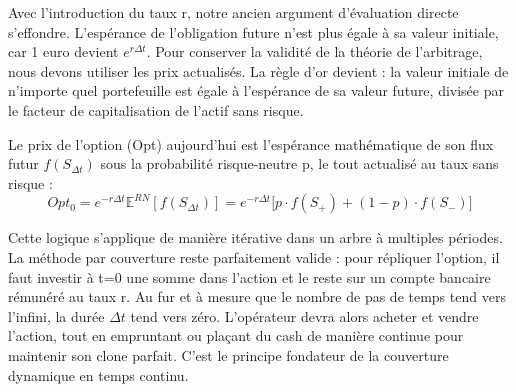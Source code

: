 \begin{remarquebox}
Avec l'introduction du taux r, notre ancien argument d'évaluation directe s'effondre. L'espérance de l'obligation future n'est plus égale à sa valeur initiale, car 1 euro devient $e^{r\Delta t}$. 
Pour conserver la validité de la théorie de l'arbitrage, nous devons utiliser les prix actualisés. La règle d'or devient : la valeur initiale de n'importe quel portefeuille est égale à l'espérance de sa valeur future, divisée par le facteur de capitalisation de l'actif sans risque.
\end{remarquebox}

\begin{definitionbox}
Le prix de l'option (Opt) aujourd'hui est l'espérance mathématique de son flux futur $f(S_{\Delta t})$ sous la probabilité risque-neutre p, le tout actualisé au taux sans risque :
\begin{equation*}
    Opt_0 = e^{-r\Delta t} \mathbb{E}^{RN}[f(S_{\Delta t})] = e^{-r\Delta t} \Big[ p \cdot f(S_+) + (1-p) \cdot f(S_-) \Big]
\end{equation*}
\end{definitionbox}

\begin{intuitionbox}
Cette logique s'applique de manière itérative dans un arbre à multiples périodes. La méthode par couverture reste parfaitement valide : pour répliquer l'option, il faut investir à t=0 une somme dans l'action et le reste sur un compte bancaire rémunéré au taux r. 
Au fur et à mesure que le nombre de pas de temps tend vers l'infini, la durée $\Delta t$ tend vers zéro. L'opérateur devra alors acheter et vendre l'action, tout en empruntant ou plaçant du cash de manière continue pour maintenir son clone parfait. C'est le principe fondateur de la couverture dynamique en temps continu.
\end{intuitionbox}

\newpage

